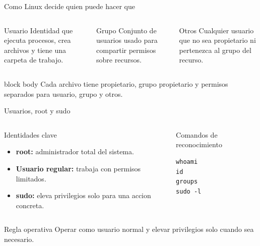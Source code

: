 \documentclass[aspectratio=169]{beamer}
\begin{document}
\begin{frame}{Como Linux decide quien puede hacer que}
  \small
  \begin{columns}[t]
    \begin{block}{Usuario}
      Identidad que ejecuta procesos, crea archivos y tiene una carpeta de trabajo.
    \end{block}
    \begin{exampleblock}{Grupo}
      Conjunto de usuarios usado para compartir permisos sobre recursos.
    \end{exampleblock}
    \begin{alertblock}{Otros}
      Cualquier usuario que no sea propietario ni pertenezca al grupo del recurso.
    \end{alertblock}
  \end{columns}
  \vfill
  \begin{beamercolorbox}[rounded=true, shadow=false, sep=4pt, center]{block body}
    \small Cada archivo tiene propietario, grupo propietario y permisos separados para usuario, grupo y otros.
  \end{beamercolorbox}
\end{frame}

\begin{frame}[fragile]{Usuarios, root y sudo}
  \small
  \begin{columns}[t]
    \begin{block}{Identidades clave}
      \begin{itemize}
        \item \textbf{root:} administrador total del sistema.
        \item \textbf{Usuario regular:} trabaja con permisos limitados.
        \item \textbf{sudo:} eleva privilegios solo para una accion concreta.
      \end{itemize}
    \end{block}
    \begin{exampleblock}{Comandos de reconocimiento}
\begin{verbatim}
whoami
id
groups
sudo -l
\end{verbatim}
    \end{exampleblock}
  \end{columns}
  \vfill
  \begin{alertblock}{Regla operativa}
    Operar como usuario normal y elevar privilegios solo cuando sea necesario.
  \end{alertblock}
\end{frame}
\end{document}
